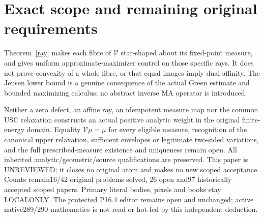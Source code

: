 \documentclass[11pt]{article}
\newcommand{\V}{\mathcal V}
\begin{document}
\section{Exact scope and remaining original requirements}
Theorem~\ref{ray} makes each fibre of $\V$ star-shaped about its
fixed-point measure, and gives uniform approximate-maximizer control
on those specific rays. It does not prove convexity of a whole fibre,
or that equal images imply dual affinity. The Jensen lower bound is
a genuine consequence of the actual Green estimate and bounded
maximizing calculus; no abstract inverse MA operator is introduced.

Neither a zero defect, an affine ray, an idempotent measure map nor
the common USC relaxation constructs an actual positive analytic
weight in the original finite-energy domain. Equality $\V\mu=\mu$
for every eligible measure, recognition of the canonical upper
relaxation, sufficient envelopes or legitimate two-sided variations,
and the full prescribed-measure existence and uniqueness remain open.
All inherited analytic/geometric/source qualifications are preserved.
This paper is UNREVIEWED; it closes no original atom and makes no
new scoped acceptance. Counts remain16/42 original problems solved,
26 open and97 historically accepted scoped papers. Primary literal
bodies, pixels and books stay LOCALONLY. The protected P16.4 editor
remains open and unchanged; active native289/290 mathematics is not
read or hot-fed by this independent deduction.
\end{document}
